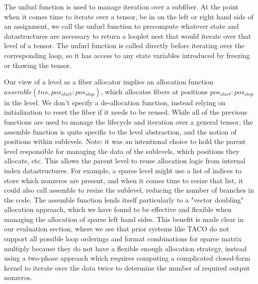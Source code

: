 The unfurl function is used to manage iteration over a subfiber. At the point
when it comes time to iterate over a tensor, be in on the left or right hand
side of an assignment, we call the unfurl function to precompute whatever state
and datastructures are necessary to return a looplet nest that would iterate
over that level of a tensor. The unfurl function is called directly before
iterating over the corresponding loop, so it has access to any state variables introduced
by freezing or thawing the tensor.

Our view of a level as a fiber allocator implies an allocation function
$assemble(tns, pos_{start}:pos_{stop})$, which allocates fibers at positions
$pos_{start}:pos_{stop}$ in the level. We don't specify a de-allocation
function, instead relying on initialization to reset the fiber if it needs to be
reused. While all of the previous functions are used to manage the lifecycle and
iteration over a general tensor, the assemble function is quite specific to the
level abstraction, and the notion of positions within sublevels. Note: it was an
intentional choice to hold the parent level responsible for managing the
data of the sublevels, which positions they allocate, etc. This allows the parent
level to reuse allocation logic from internal index datastructures. For example,
a sparse level might use a list of indices to store which nonzeros are present,
and when it comes time to resize that list, it could also call assemble to resize the
sublevel, reducing the number of branches in the code. The assemble function
lends itself particularly to a "vector doubling" allocation approach, which we
have found to be effective and flexible when managing the allocation
of sparse left hand sides. This benefit is made clear in our evaluation section,
where we see that prior systems like TACO do not support all possible loop
orderings and format combinations for sparse matrix multiply because they do
not have a flexible enough allocation strategy, instead using a two-phase approach
which requires computing a complicated closed-form kernel to iterate over the
data twice to determine the number of required output nonzeros.

